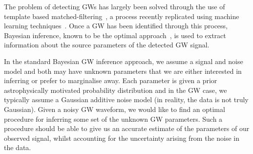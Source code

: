\documentclass[%
showpacs,
 amsmath,amssymb,
 aps,
 twocolumn,
 prl,
 reprint,
floatfix,
]{revtex4-1}
\begin{document}
%
%
%

%
%
The problem of detecting \acp{GW} has largely been solved through the use of
template based matched-filtering~\cite{0264-9381-33-21-215004}, a process
recently replicated using machine learning
techniques~\cite{GEORGE201864,PhysRevLett.120.141103,GebKilParHarSch}. Once a
\ac{GW} has been identified through this process, Bayesian inference, known to
be the optimal approach~\cite{2009CQGra..26o5017S}, is used to extract
information about the source parameters of the detected \ac{GW} signal.

%
%
In the standard Bayesian \ac{GW} inference approach, we assume a signal and
noise model and both may have unknown parameters that we are either interested
in inferring or prefer to marginalise away. Each parameter is given a prior
astrophysically motivated probability distribution and in the \ac{GW} case, we
typically assume a Gaussian additive noise model (in reality, the data is not
truly Gaussian). Given a noisy \ac{GW} waveform, we would like to find an
optimal procedure for inferring some set of the unknown \ac{GW} parameters.
Such a procedure should be able to give us an accurate estimate of the
parameters of our observed signal, whilst accounting for the uncertainty
arising from the noise in the data.
\end{document}
